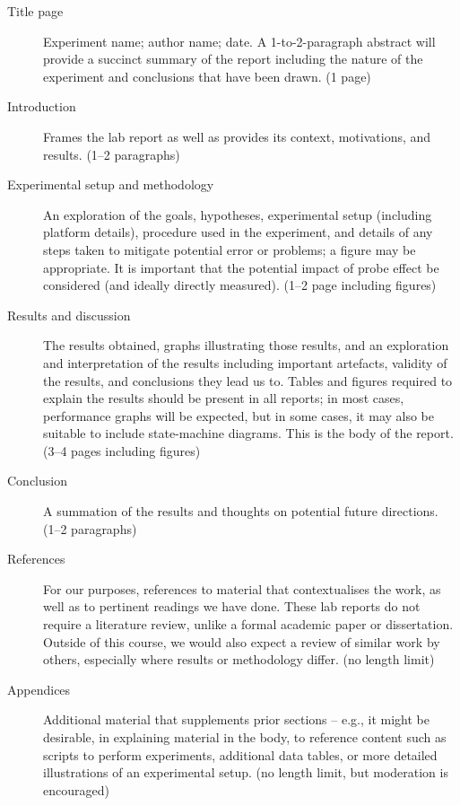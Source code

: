 \documentclass[a4paper,10pt]{article}
\begin{document}
\begin{description}
\item[Title page] Experiment name; author name; date.
  A 1-to-2-paragraph abstract will provide a succinct summary of the report
  including the nature of the experiment and conclusions that have been drawn.
  (1 page)

\item[Introduction] Frames the lab report as well as provides its context,
  motivations, and results.  (1--2 paragraphs)

\item[Experimental setup and methodology] An exploration of the goals,
  hypotheses, experimental setup (including platform details), procedure
  used in the experiment, and details of any steps taken to mitigate potential
  error or problems; a figure may be appropriate.
  It is important that the potential impact of probe effect be considered (and
  ideally directly measured).  (1--2 page including figures)

\item[Results and discussion]
  The results obtained, graphs illustrating those results, and an exploration
  and interpretation of the results including important artefacts, validity of
  the results, and conclusions they lead us to.
  Tables and figures required to explain the results should be present in all
  reports; in most cases, performance graphs will be expected, but in some
  cases, it may also be suitable to include state-machine diagrams.
  This is the body of the report.  (3--4 pages including figures)

\item[Conclusion]
  A summation of the results and thoughts on potential future directions.
  (1--2 paragraphs)

\item[References]
  For our purposes, references to material that contextualises the work, as
  well as to pertinent readings we have done.
  These lab reports do not require a literature review, unlike a formal
  academic paper or dissertation.
  Outside of this course, we would also expect a review of similar work by
  others, especially where results or methodology differ.
  (no length limit)

\item[Appendices]
  Additional material that supplements prior sections -- e.g., it might be
  desirable, in explaining material in the body, to reference content such as
  scripts to perform experiments, additional data tables, or more detailed
  illustrations of an experimental setup.
  (no length limit, but moderation is encouraged)

\end{description}
\end{document}
